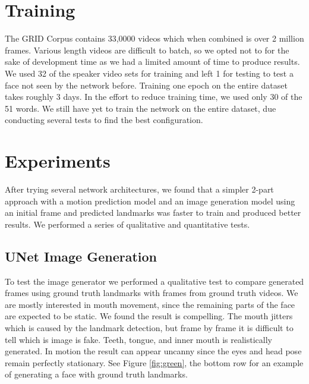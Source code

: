 \documentclass[10pt,twocolumn,letterpaper]{article}
\begin{document}
\section{Training}
 The GRID Corpus contains 33,0000 videos which when combined is over 2 million frames. Various length videos are difficult to batch, so we opted not to for the sake of development time as we had a limited amount of time to produce results. We used 32 of the speaker video sets for training and left 1 for testing to test a face not seen by the network before. Training one epoch on the entire dataset takes roughly 3 days. In the effort to reduce training time, we used only 30 of the 51 words. We still have yet to train the network on the entire dataset, due conducting several tests to find the best configuration.

\section{Experiments}

 After trying several network architectures, we found that a simpler 2-part approach with a motion prediction model and an image generation model using an initial frame and predicted landmarks was faster to train and produced better results. We performed a series of qualitative and quantitative tests. 
 
\subsection{UNet Image Generation}
 To test the image generator we performed a qualitative test to compare generated frames using ground truth landmarks with frames from ground truth videos. We are mostly interested in mouth movement, since the remaining parts of the face are expected to be static. We found the result is compelling. The mouth jitters which is caused by the landmark detection, but frame by frame it is difficult to tell which is image is fake. Teeth, tongue, and inner mouth is realistically generated. In motion the result can appear uncanny since the eyes and head pose remain perfectly stationary. See Figure \ref*{fig:green}, the bottom row for an example of generating a face with ground truth landmarks.
\end{document}
